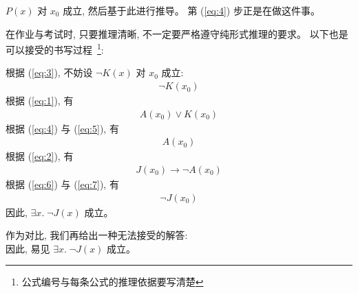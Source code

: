 \documentclass[a4paper, justified]{tufte-handout}
\begin{document}
\begin{solution}
{\begin{description}
         $P(x)$ 对 $x_{0}$ 成立, 然后基于此进行推导。
        第 (\ref{eq:4}) 步正是在做这件事。
    \end{description}
  }

  在作业与考试时, 只要推理清晰, 不一定要严格遵守纯形式推理的要求。
  以下也是可以接受的书写过程~\footnote{公式编号与每条公式的推理依据要写清楚}:

  \setcounter{equation}{3}
  \noindent 根据 (\ref{eq:3}), 不妨设 $\lnot K(x)$ 对 $x_{0}$ 成立:
  \begin{align}
    \lnot K(x_{0}) \label{eq:4}
  \end{align}
  根据 (\ref{eq:1}), 有
  \begin{align}
    A(x_{0}) \lor K(x_{0}) \label{eq:5}
  \end{align}
  根据 (\ref{eq:4}) 与 (\ref{eq:5}), 有
  \begin{align}
    A(x_{0}) \label{eq:6}
  \end{align}
  根据 (\ref{eq:2}), 有
  \begin{align}
    J(x_{0}) \to \lnot A(x_{0}) \label{eq:7}
  \end{align}
  根据 (\ref{eq:6}) 与 (\ref{eq:7}), 有
  \begin{align}
    \lnot J(x_{0}) \label{eq:8}
  \end{align}
  因此, $\exists x.\; \lnot J(x)$ 成立。

  作为对比, 我们再给出一种无法接受的解答: \\
  \lipsum[1]
  因此, 易见 $\exists x.\; \lnot J(x)$ 成立。
\end{solution}
\end{document}
